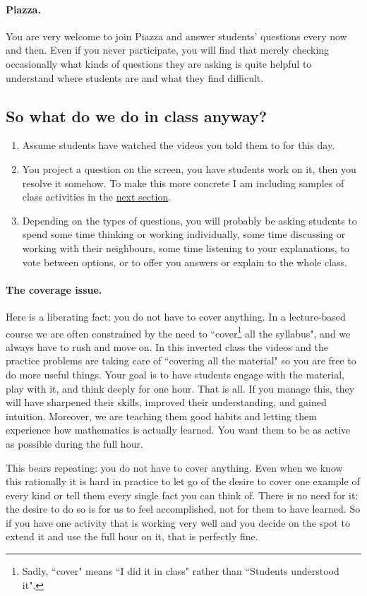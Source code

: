 \documentclass[11pt]{article}
\begin{document}
		\paragraph{Piazza.}   You are very welcome to join Piazza and answer students' questions every now and then.  Even if you never participate, you will find that merely checking occasionally what kinds of questions they are asking is quite helpful to understand where students are and what they find difficult.

\subsection{So what do we do in class anyway?}

\begin{enumerate}
\item Assume students have watched the videos you told them to for this day.

\item You project a question on the screen, you have students work on it, then you resolve it somehow.  To make this more concrete I am including samples of class activities in the \hyperref[sec:activities]{next section}.

\item Depending on the types of questions, you will probably be asking students to spend some time thinking or working individually, some time discussing or working with their neighbours, some time listening to your explanations, to vote between options, or to offer you answers or explain to the whole class.

\end{enumerate}


{\baselineskip
\paragraph{The coverage issue.} Here is a liberating fact: you do not have to cover anything.  In a lecture-based course we are often constrained by the need to ``cover\footnote{Sadly, ``cover" means ``I did it in class" rather than ``Students understood it".} all the syllabus", and we always have to rush and move on.  In this inverted class the videos and the practice problems are taking care of ``covering all the material" so you are free to do more useful things.    Your goal is to have students engage with the material, play with it, and think deeply for one hour.  That is all.  If you manage this, they will have sharpened their skills, improved their understanding, and gained intuition.   Moreover, we are teaching them good habits and letting them experience how mathematics is actually learned.  You want them to be as active as possible during the full hour.

This bears repeating: you do not have to cover anything.  Even when we know this rationally it is hard in practice to let go of the desire to cover one example of every kind or tell them every single fact you can think of.   There is no need for it: the desire to do so is for us to feel accomplished, not for them to have learned.   So if you have one activity that is working very well and you decide on the spot to extend it and use the full hour on it, that is perfectly fine.
}
\end{document}
